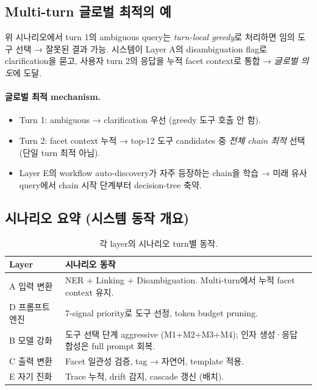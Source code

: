 \documentclass[11pt]{article}
\theoremstyle{definition}
\begin{document}
\subsection{Multi-turn 글로벌 최적의 예}

위 시나리오에서 turn 1의 ambiguous query는 \emph{turn-local greedy}로 처리하면 임의 도구 선택 → 잘못된 결과 가능. 시스템이 Layer A의 disambiguation flag로 clarification을 묻고, 사용자 turn 2의 응답을 누적 facet context로 통합 → \emph{글로벌 의도}에 도달.

\paragraph{글로벌 최적 mechanism.}
\begin{itemize}[leftmargin=*]
\item Turn 1: ambiguous → clarification 우선 (greedy 도구 호출 안 함).
\item Turn 2: facet context 누적 → top-12 도구 candidates 중 \emph{전체 chain 최적} 선택 (단일 turn 최적 아님).
\item Layer E의 workflow auto-discovery가 자주 등장하는 chain을 학습 → 미래 유사 query에서 chain 시작 단계부터 decision-tree 축약.
\end{itemize}

\subsection{시나리오 요약 (시스템 동작 개요)}

\begin{table}[h]
\centering
\caption{각 layer의 시나리오 turn별 동작.}
\label{tab:scenario-summary}
\small
\begin{tabular}{lp{}}
\toprule
Layer & 시나리오 동작 \\
\midrule
A 입력 변환 & NER + Linking + Disambiguation. Multi-turn에서 누적 facet context 유지. \\
D 프롬프트 엔진 & 7-signal priority로 도구 선정, token budget pruning. \\
B 모델 강화 & 도구 선택 단계 aggressive (M1+M2+M3+M4); 인자 생성·응답 합성은 full prompt 회복. \\
C 출력 변환 & Facet 일관성 검증, tag → 자연어, template 적용. \\
E 자기 진화 & Trace 누적, drift 감지, cascade 갱신 (배치). \\
\bottomrule
\end{tabular}
\end{table}
\end{document}
